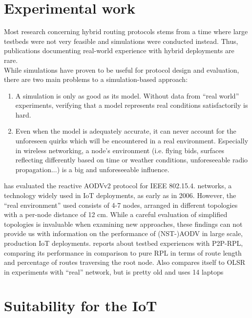 \documentclass[a4paper,10pt]{scrartcl}
\begin{document}
\section{Experimental work}
\label{sec:experiments}
Most research concerning hybrid routing protocols stems from a time where large testbeds were not very feasible and simulations were conducted instead. 
Thus, publications documenting real-world experience with hybrid deployments are rare.\\
While simulations have proven to be useful for protocol design and evaluation, there are two main problems to a simulation-based approach: 
\begin{enumerate}
\item A simulation is only as good as its model. Without data from ``real world'' experiments, verifying that a model represents real conditions satisfactorily is hard.
\item Even when the model is adequately accurate, it can never account for the unforeseen quirks which will be encountered in a real environment. Especially in wireless networking, a node's environment (i.e. flying bids, surfaces reflecting differently based on time or weather conditions, unforeseeable radio propagation...) is a big and unforeseeable influence.
\end{enumerate}

\cite{gomez_NSTAODV_eval} has evaluated the reactive AODVv2 protocol for IEEE 802.15.4. networks, a technology widely used in IoT deployments, as early as in 2006. However, the ``real environment'' used consists of 4-7 nodes, arranged in different topologies with a per-node distance of 12 cm. While a careful evaluation of simplified topologies is invaluable when examining new approaches, these findings can not provide us with information on the performance of (NST-)AODV in large scale, production IoT deployments.
\cite{baccelli_p2p_prl} reports about testbed experiences with P2P-RPL, comparing its performance in comparison to pure RPL in terms of route length and percentage of routes traversing the root node.
\cite{WARP} Also compares itself to OLSR in experiments with ``real'' network, but is pretty old and uses 14 laptops 


\section{Suitability for the IoT}
\label{sec:suitability}
\end{document}
